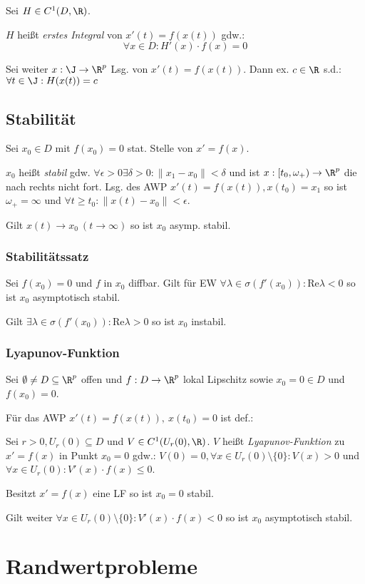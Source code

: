 Sei \(H \in C^1(D,\R)\).

\(H\) heißt \emph{erstes Integral} von \(x'(t)=f(x(t))\) gdw.: \[\forall x \in D : H'(x) \cdot f(x) = 0\]

Sei weiter \(x : \J \to \R^p\) Lsg. von \(x'(t)=f(x(t))\). Dann ex. \(c \in \R\) s.d.: \(\forall t \in \J : H(x(t))=c\)

\subsection*{Stabilität}

Sei \(x_0 \in D\) mit \(f(x_0)=0\) stat. Stelle von \(x'=f(x)\).

\spacing

\(x_0\) heißt \emph{stabil} gdw. \(\forall \epsilon > 0 \exists \delta > 0 : \|x_1-x_0\| < \delta\) und ist \(x : [t_0,\omega_+) \to \R^p\) die nach rechts nicht fort. Lsg. des AWP \(x'(t)=f(x(t)), x(t_0)=x_1\) so ist \(\omega_+ = \infty\) und \(\forall t \geq t_0 : \|x(t)-x_0\| < \epsilon\).

\spacing

Gilt \(x(t) \to x_0 \ (t \to \infty)\) so ist \(x_0\) asymp. stabil.

\subsubsection*{Stabilitätssatz}

Sei \(f(x_0)=0\) und \(f\) in \(x_0\) diffbar. Gilt für EW \(\forall \lambda \in \sigma(f'(x_0)) : \text{Re} \lambda < 0\) so ist \(x_0\) asymptotisch stabil.

\spacing

Gilt \(\exists \lambda \in \sigma(f'(x_0)) : \text{Re} \lambda > 0\) so ist \(x_0\) instabil.

\subsubsection*{Lyapunov-Funktion}

Sei \(\emptyset \neq D \subseteq \R^p\) offen und \(f : D \to \R^p\) lokal Lipschitz sowie \(x_0 = 0 \in D\) und \(f(x_0)=0\).

Für das AWP \(x'(t)=f(x(t)), \ x(t_0)=0\) ist def.:

\spacing

Sei \(r > 0, U_r(0) \subseteq D\) und \(V \in C^1(U_r(0),\R)\). \(V\) heißt \emph{Lyapunov-Funktion} zu \(x'=f(x)\) in Punkt \(x_0=0\) gdw.: \(V(0)=0, \forall x \in U_r(0) \setminus \{0\} : V(x) > 0\) und \(\forall x \in U_r(0) : V'(x) \cdot f(x) \leq 0\).

\spacing

Besitzt \(x'=f(x)\) eine LF so ist \(x_0=0\) stabil.

\spacing

Gilt weiter \(\forall x \in U_r(0) \setminus \{0\} : V'(x) \cdot f(x) < 0\) so ist \(x_0\) asymptotisch stabil.

\section*{Randwertprobleme}
